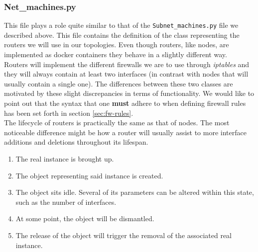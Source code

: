 \subsubsection{Net\_machines.py}
    This file plays a role quite similar to that of the \texttt{Subnet\_machines.py} file we described above. This file contains the definition of the class representing the routers we will use in our topologies. Even though routers, like nodes, are implemented as docker containers they behave in a slightly different way.\\

    Routers will implement the different firewalls we are to use through \textit{iptables} and they will always contain at least two interfaces (in contrast with nodes that will usually contain a single one). The differences between these two classes are motivated by these slight discrepancies in terms of functionality. We would like to point out that the syntax that one \textbf{must} adhere to when defining firewall rules has been set forth in section \ref{sec:fw-rules}.\\

    The lifecycle of routers is practically the same as that of nodes. The most noticeable difference might be how a router will usually assist to more interface additions and deletions throughout its lifespan.\\

    \begin{enumerate}
        \item The real instance is brought up.
        \item The object representing said instance is created.
        \item The object sits idle. Several of its parameters can be altered within this state, such as the number of interfaces.
        \item At some point, the object will be dismantled.
        \item The release of the object will trigger the removal of the associated real instance.
    \end{enumerate}

